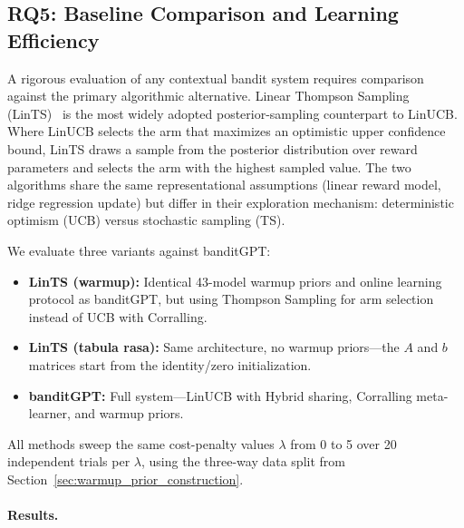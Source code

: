 
\subsection{RQ5: Baseline Comparison and Learning Efficiency}
\label{sec:lints_comparison}
\label{sec:cumulative_regret}

A rigorous evaluation of any contextual bandit system requires comparison
against the primary algorithmic alternative.  Linear Thompson Sampling
(LinTS)~\cite{agrawal2013thompson} is the most widely adopted posterior-sampling
counterpart to LinUCB.  Where LinUCB selects the arm that maximizes an
optimistic upper confidence bound, LinTS draws a sample from the posterior
distribution over reward parameters and selects the arm with the highest
sampled value.  The two algorithms share the same representational assumptions
(linear reward model, ridge regression update) but differ in their exploration
mechanism: deterministic optimism (UCB) versus stochastic sampling (TS).

We evaluate three variants against banditGPT:
\begin{itemize}[leftmargin=*,nosep]
  \item \textbf{LinTS (warmup):} Identical 43-model warmup priors and online
        learning protocol as banditGPT, but using Thompson Sampling for arm
        selection instead of UCB with Corralling.
  \item \textbf{LinTS (tabula rasa):} Same architecture, no warmup priors---the
        \(A\) and \(b\) matrices start from the identity/zero initialization.
  \item \textbf{banditGPT:} Full system---LinUCB with Hybrid sharing,
        Corralling meta-learner, and warmup priors.
\end{itemize}

\noindent All methods sweep the same cost-penalty values
\(\lambda\) from 0 to 5 over 20 independent trials per
\(\lambda\), using the three-way data split from Section~\ref{sec:warmup_prior_construction}.

\paragraph{Results.}

